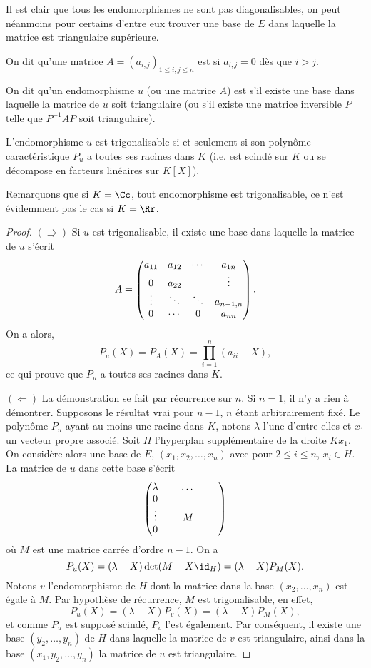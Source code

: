 \documentclass[class=report,crop=false]{standalone}
\begin{document}
Il est clair que tous les endomorphismes ne sont pas diagonalisables, 
on peut néanmoins pour certains d'entre eux trouver une base de $E$ dans 
laquelle la matrice est triangulaire supérieure.

\begin{definition}
On dit qu'une matrice $A=(a_{i,j})_{1\leq i,j\leq n}$ est  
si $a_{i,j}=0$ dès que $i> j$.
\end{definition} 


\begin{definition}
On dit qu'un endomorphisme $u$ (ou une matrice $A$) est  s'il existe une
base dans laquelle la matrice de $u$ soit triangulaire 
(ou s'il existe une matrice inversible $P$ telle que $P^{-1}AP$ soit triangulaire).
\end{definition} 


\begin{theoreme}
L'endomorphisme $u$ est trigonalisable si et seulement si son polynôme caractéristique
$P_u$ a toutes ses racines dans $K$ (i.e. est scindé sur $K$ ou se décompose en facteurs linéaires sur $K[X]$).

\end{theoreme} 

Remarquons que si $K=\Cc$, tout endomorphisme est trigonalisable, 
ce n'est évidemment pas le cas si $K=\Rr$.

\begin{proof}
$(\Rrightarrow)$ Si $u$ est trigonalisable, il existe une base dans laquelle la matrice de $u$ s'écrit
$$A=\left(\begin{matrix}a_{11}&a_{12}&\cdots &a_{1n} \cr 0&a_{22} & &\vdots \cr\vdots &\ddots &\ddots& a_{n-1,n}\cr0&\cdots&0&a_{nn}\end{matrix}\right).$$On a alors,
$$P_u(X)=P_A(X)=\prod_{i=1}^n(a_{ii}-X),$$
ce qui prouve que $P_u$ a toutes ses racines dans $K$.

$(\Leftarrow)$ La démonstration se fait par récurrence sur $n$. Si $n=1$, il n'y a rien à démontrer. Supposons le résultat vrai pour $n-1$, $n$ étant arbitrairement fixé. Le polynôme $P_u$ ayant au moins une racine dans $K$, notons $\lambda$ l'une d'entre elles et $x_1$ un vecteur propre associé. Soit $H$ l'hyperplan supplémentaire de la droite $Kx_1$. On considère alors une base de $E$, $(x_1,x_2,\dots,x_n)$ avec pour $2\leq i\leq n$, $x_i\in H$. La matrice de $u$ dans cette base s'écrit
$$\left(\begin{matrix}\lambda &\ &\dots& \cr0 &\ &\ & \cr \vdots& & M\cr 0&\ &\ &\ & \end{matrix}\right)$$
où $M$ est une matrice carrée d'ordre $n-1$. On a 
$$P_u(X)=(\lambda-X)\det(M-X\id_H)=(\lambda-X)P_M(X).$$
Notons $v$ l'endomorphisme de $H$ dont la matrice dans la base $(x_2,\dots,x_n)$ est égale à $M$. Par hypothèse de récurrence, $M$ est trigonalisable, en effet, 
$$P_u(X)=(\lambda-X)P_v(X)=(\lambda-X)P_M(X),$$
 et comme $P_u$ est supposé scindé, $P_v$ l'est également. Par conséquent, il existe une base $(y_2,\dots,y_n)$ de $H$ dans laquelle la matrice de $v$ est triangulaire, ainsi dans la base $(x_1,y_2,\dots,y_n)$ la matrice de $u$ est triangulaire.
   
\end{proof} 
\end{document}
